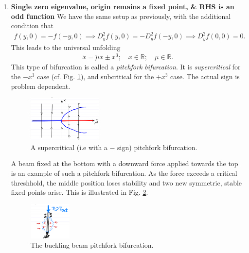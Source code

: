 \begin{enumerate}
	\item \textbf{Single zero eigenvalue, origin remains a fixed point, \& RHS is an odd function} 
		We have the same setup as previously, with the additional condition that
		\begin{align}
			f(y,0) = - f(-y,0)\implies D^2_{y}f(y,0) = -D^2_{y}f(-y,0) \implies D^2_{y}f(0,0) = 0.
		\end{align}
	This leads to the universal unfolding 
	\begin{align}
		\dot{x} = \tilde{\mu } x \pm x^3;\quad x \in \mathbb{R};\quad \mu \in \mathbb{R}.
	\end{align}
	This type of bifurcation is called a \emph{pitchfork bifurcation}. It is \emph{supercritical} for the $-x^3$ case (cf. Fig. \ref{fig:pitchfork_bif}), and subcritical for the $+x^3$ case. The actual sign is problem dependent.
\begin{figure}[h!]
	\centering
	\includegraphics[width=0.35\textwidth]{figures/ch3/16pitchfork_bif_A.png}
	\caption{A supercritical (i.e with a $-$ sign) pitchfork bifurcation.}
	\label{fig:pitchfork_bif}
\end{figure}

\begin{ex}
	A beam fixed at the bottom with a downward force applied towards the top is an example of such a pitchfork bifurcation. As the force exceeds a critical threshhold, the middle position loses stability and two new symmetric, stable fixed points arise. This is illustrated in Fig. \ref{fig:buckling_beam}.
	\begin{figure}[h!]
		\centering
		\includegraphics[width=0.2\textwidth]{figures/ch3/16buckling_beam_bif.png}
		\caption{The buckling beam pitchfork bifurcation.}
		\label{fig:buckling_beam}
	\end{figure}
	
\end{ex}


\end{enumerate}
